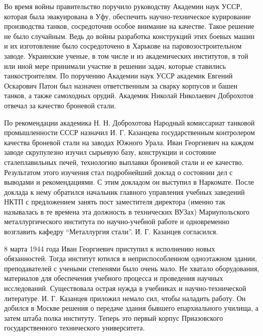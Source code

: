 Во время войны правительство поручило руководству Академии наук УССР, которая
была эвакуирована в Уфу, обеспечить научно-техническое курирование производства
танков, сосредоточив особое внимание на качестве. Такое решение не было
случайным. Ведь до войны разработка конструкций этих боевых машин и их
изготовление было сосредоточено в Харькове на паровозостроительном заводе.
Украинские ученые, в том числе и из академических институтов, в той или иной
мере принимали участие в решении задач, которые ставились танкостроителям. По
поручению Академии наук УССР академик Евгений Оскарович Патон был назначен
ответственным за сварку корпусов и башен танков, а также самоходных орудий.
Академик Николай Николаевич Доброхотов отвечал за качество броневой стали.

По рекомендации академика Н. Н. Доброхотова Народный комиссариат танковой
промышленности СССР назначил И. Г. Казанцева государственным контролером
качества броневой стали на заводах Южного Урала. Иван Георгиевич на каждом
заводе скрупулезно изучил сырьевую базу, конструкции и состояние
сталеплавильных печей, технологию выплавки броневой стали и ее качество.
Результатом этого изучения стал подробнейший доклад о состоянии дел с выводами
и рекомендациями. С этим докладом он выступил в Наркомате. После доклада к нему
обратился начальник главного управления учебных заведений НКТП с предложением
занять пост заместителя директора (именно так называлась в те времена эта
должность в технических ВУЗах) Мариупольского металлургического института по
научно-учебной работе и одновременно возглавить кафедру \enquote{Металлургия стали}.
И. Г. Казанцев согласился.

8 марта 1944 года Иван Георгиевич приступил к исполнению новых обязанностей.
Тогда институт ютился в неприспособленном одноэтажном здании, преподавателей с
учеными степенями было очень мало. Не хватало оборудования, материалов для
обеспечения учебного процесса и проведения научных исследований. Существовала
острая нужда в учебниках и научно-технической литературе. И. Г. Казанцев
приложил немало сил, чтобы наладить работу. Он добился в Москве решения о
передаче здания бывшего епархиального училища, а затем штаба полка институту.
Теперь это первый корпус Приазовского государственного технического
университета.

